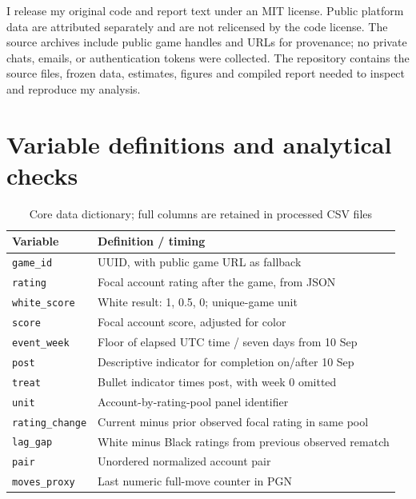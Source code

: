 \documentclass[11pt,a4paper]{article}
\begin{document}
I release my original code and report text under an MIT license. Public platform data are attributed separately and are not relicensed by the code license. The source archives include public game handles and URLs for provenance; no private chats, emails, or authentication tokens were collected. The repository contains the source files, frozen data, estimates, figures and compiled report needed to inspect and reproduce my analysis.

\clearpage\appendix

\section{Variable definitions and analytical checks}

\begin{table}[H]\centering\small\caption{Core data dictionary; full columns are retained in processed CSV files}\begin{tabular}{p{4.4cm}p{9cm}}\toprule

Variable & Definition / timing \\ \midrule

\texttt{game\_id} & UUID, with public game URL as fallback \\

\texttt{rating} & Focal account rating after the game, from JSON \\

\texttt{white\_score} & White result: 1, 0.5, 0; unique-game unit \\

\texttt{score} & Focal account score, adjusted for color \\

\texttt{event\_week} & Floor of elapsed UTC time / seven days from 10 Sep \\

\texttt{post} & Descriptive indicator for completion on/after 10 Sep \\

\texttt{treat} & Bullet indicator times post, with week 0 omitted \\

\texttt{unit} & Account-by-rating-pool panel identifier \\

\texttt{rating\_change} & Current minus prior observed focal rating in same pool \\

\texttt{lag\_gap} & White minus Black ratings from previous observed rematch \\

\texttt{pair} & Unordered normalized account pair \\

\texttt{moves\_proxy} & Last numeric full-move counter in PGN \\

\bottomrule\end{tabular}\end{table}
\end{document}
